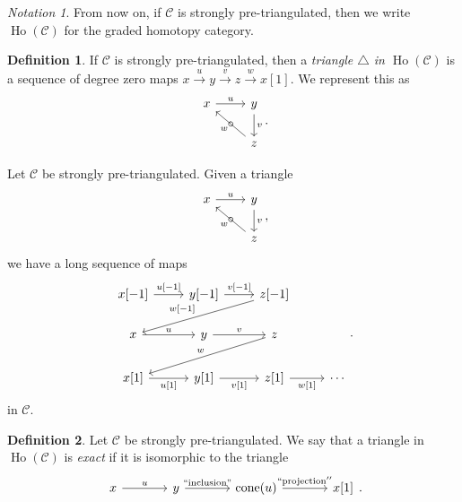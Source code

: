 \documentclass[10pt,letterpaper,cm]{nupset}
\theoremstyle{definition}
\newtheorem{definition}{Definition}[subsection]
\theoremstyle{theorem}
\theoremstyle{remark}
\newtheorem*{notation}{Notation}
\newcommand{\1}{\mathbf{1}}
\renewcommand{\c}{\mathscr{C}}
\newcommand{\0}{\vec 0}
\DeclareMathOperator{\cone}{cone}
\DeclareMathOperator{\ho}{Ho}
\begin{document}
\begin{notation}
From now on, if $\c$ is strongly pre-triangulated, then we write $\ho(\c)$ for the graded homotopy category. 
\end{notation}


\begin{definition}
If $\c$ is strongly pre-triangulated, then a \textit{triangle $\triangle$ in $\ho(\c)$} is a sequence of degree zero maps $x\overset{u}{\longrightarrow} y\overset{v}{\longrightarrow}z \overset{w}{\longrightarrow}  x[1]$. We represent this as 
\[
\begin{tikzcd}
x \arrow[r, "u"] & y \arrow[d, "v"]  \\
                 & z \arrow[lu, "\circ" marking, "w"]
\end{tikzcd}
.\]
\end{definition}

\medskip

Let $\c$ be  strongly pre-triangulated. 
Given a triangle 
\[
\begin{tikzcd}
x \arrow[r, "u"] & y \arrow[d, "v"]  \\
                 & z \arrow[lu, "\circ" marking, "w"]
\end{tikzcd}
,\]
we have a long sequence of maps 
\[
\begin{tikzcd}
{x[{-1}]} \arrow[r, "{u[{-1}]}"] & {y[{-1}]} \arrow[r, "{v[{-1}]}"] & {z[{-1}]} \arrow[lld, "{w[{-1}]}"'] &        \\
x \arrow[r, "u"]                 & y \arrow[r, "v"]                 & z \arrow[lld, "w"']                 &        \\
{x[1]} \arrow[r, "{u[1]}"']      & {y[1]} \arrow[r, "{v[1]}"']      & {z[1]} \arrow[r, "{w[1]}"']         & \cdots
\end{tikzcd}.
\]
in $\c$.


\begin{definition}  Let $\c$ be strongly pre-triangulated.
We say that a triangle in $\ho(\c)$ is \textit{exact} if it is isomorphic to the triangle
\[
\begin{tikzcd}[column sep=large]
x \arrow[r, "u"] & y \arrow[r, "{``\text{inclusion}"}"] & \cone(u) \arrow[r, "``\text{projection}''"] & {x[1]}
\end{tikzcd}
.\]
\end{definition}
\end{document}
